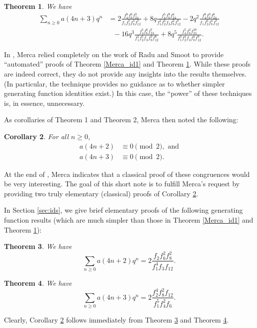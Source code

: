 \documentclass{amsart}
\newtheorem{theorem}{Theorem}[section]
\newtheorem{corollary}[theorem]{Corollary}
\begin{document}
\begin{theorem}
\label{Merca_id2}
We have 
\begin{align*}
\sum_{n\geq 0} a(4n+3)q^n 
&= 2\frac{f_4^8f_6^6f_{24}^3}{f_1f_2^7f_8^3f_{12}^7}+8q\frac{f_4^5f_6^9f_{24}^4}{f_1^2f_2^6f_3f_8^2f_{12}^8}-2q^2\frac{f_4^8f_6^3f_{24}^6}{f_1f_2^6f_8^4f_{12}^7} \\
&\ \ \ -16q^3\frac{f_4^5f_6^6f_{24}^7}{f_1^2f_2^5f_3f_8^3f_{12}^8} +8q^5\frac{f_4^5f_6^3f_{24}^{10}}{f_1^2f_2^4f_3f_8^4f_{12}^8}.
\end{align*}
\end{theorem}
In \cite{MercaAM}, Merca relied completely on the work of Radu \cite{SR} and Smoot \cite{NS} to provide ``automated'' proofs of Theorem \ref{Merca_id1} and Theorem \ref{Merca_id2}.  While these proofs are indeed correct, they do not provide any insights into the results themselves.  (In particular, the technique provides no guidance as to whether simpler generating function identities exist.)  In this case, the ``power'' of these techniques is, in essence, unnecessary.  

As corollaries of Theorem 1 and Theorem 2, Merca then noted the following:  

\begin{corollary}
\label{Merca_congs}
For all $n\geq 0$, 
\begin{align*}
a(4n+2) &\equiv 0 \pmod{2}, \textrm{\ \ and} \\
a(4n+3) &\equiv 0 \pmod{2}.
\end{align*}
\end{corollary}
At the end of \cite[Section 4]{MercaAM}, Merca indicates that a classical proof of these congruences would be very interesting. The goal of this short note is to fulfill Merca's request by providing two truly elementary (classical) proofs of Corollary \ref{Merca_congs}.  

In Section \ref{sec:ids}, we give brief elementary proofs of the following generating function results (which are much simpler than those in Theorem \ref{Merca_id1} and Theorem \ref{Merca_id2}): 

\begin{theorem}
\label{JAS_id1}
We have 
$$
\sum_{n\geq 0} a(4n+2)q^n = 2\frac{f_2f_6^2f_8^2}{f_1^4f_3f_{12}}.
$$
\end{theorem}

\begin{theorem}
\label{JAS_id2}
We have 
$$
\sum_{n\geq 0} a(4n+3)q^n = 2\frac{f_2^4f_8^2f_{12}}{f_1^5f_4^2f_6}.
$$

\end{theorem}
\noindent 
Clearly, Corollary \ref{Merca_congs} follows immediately from Theorem \ref{JAS_id1} and Theorem \ref{JAS_id2}.  
\end{document}
